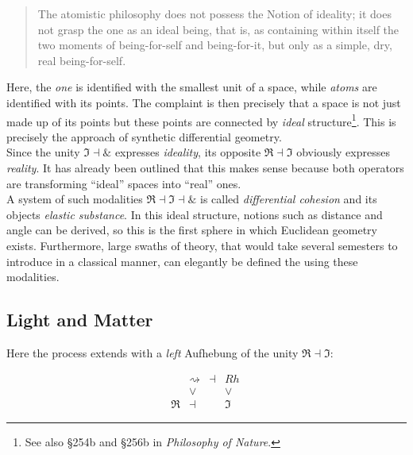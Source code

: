 \documentclass{article}
\begin{document}
\begin{quote}
    The atomistic philosophy does not possess the Notion of ideality; it does not grasp the one as an
ideal being, that is, as containing within itself the two moments of being-for-self and being-for-it,
but only as a simple, dry, real being-for-self.
\end{quote}

Here, the \emph{one} is identified with the smallest unit of a space, while \emph{atoms} are identified
with its points. The complaint is then precisely that a space is not just made up of its points but these
points are connected by \emph{ideal} structure\footnote{See also §254b and §256b in \emph{Philosophy of
Nature}.}. This is precisely the approach of synthetic differential geometry. \\

Since the unity $\Im\dashv\&$ expresses \emph{ideality}, its opposite $\Re\dashv\Im$ obviously expresses
\emph{reality}. It has already been outlined that this makes sense because both operators are transforming
``ideal'' spaces into ``real'' ones. \\

A system of such modalities $\Re\dashv\Im\dashv\&$ is called \emph{differential cohesion} and its objects
\emph{elastic substance}. In this ideal structure, notions such as distance and angle can be derived,
so this is the first sphere in which Euclidean geometry exists. Furthermore, large swaths of theory, that
would take several semesters to introduce in a classical manner, can elegantly be defined the using these
modalities.



\subsection{Light and Matter}
Here the process extends with a \emph{left} Aufhebung of the unity $\Re\dashv\Im$: 


$$
  \begin{array}{cccc}
     & \rightsquigarrow & \dashv & Rh
    \\
     & \vee & & \vee
    \\
    \Re & \dashv & & \Im
    \end{array}
  \ 
$$
\end{document}

